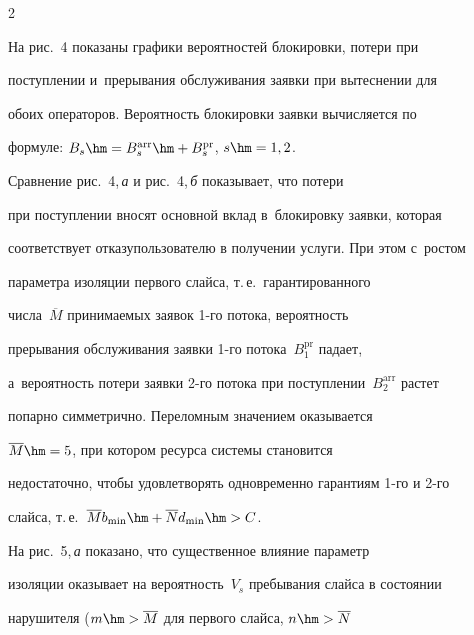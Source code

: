 \begin{multicols}{2}
\begin{figure}
\vspace*{-11pt}




\end{figure}


  


  На рис.~4 показаны графики вероятностей блокировки, потери при 


поступлении и~прерывания обслуживания заявки при вытеснении для 


обоих операторов. Вероятность блокировки заявки вы\-чис\-ля\-ет\-ся по 


формуле: $B_s\hm= B_s^{\mathrm{arr}}\hm+ B_s^{\mathrm{pr}}$, $s\hm=1,2$.




 Сравнение рис.~4,\,\textit{а} и рис.~4,\,\textit{б} показывает, что потери 


при поступлении вносят основной вклад в~блокировку заявки, которая 


соответствует отказу\linebreak пользователю в получении услуги. При этом с~рос\-том 


параметра изоляции первого слайса, т.\,е.\ гарантированного 


числа~$\overline{M}$ принимаемых заявок \mbox{1-го} потока, вероятность 


прерывания обслуживания заявки 1-го потока~$B_1^{\mathrm{pr}}$ падает, 


а~вероятность потери заявки 2-го потока при поступлении~$B_2^{\mathrm{arr}}$ растет 


попарно симметрично. Переломным значением оказывается 


$\overline{M}\hm=5$, при котором ресурса системы становится 


недостаточно, чтобы удовлетворять одновременно гарантиям 1-го и 2-го 


слайса, т.\,е.\ $\overline{M} b_{\min} \hm+ \overline{N} d_{\min}\hm>C$.


  


  На рис.~5,\,\textit{а} показано, что существенное влияние параметр 


изоляции оказывает на вероятность~$V_s$ пребывания слайса в состоянии 


нарушителя ($m\hm> \overline{M}$ для первого слайса, $n\hm> \overline{N}$ 



\end{multicols}
